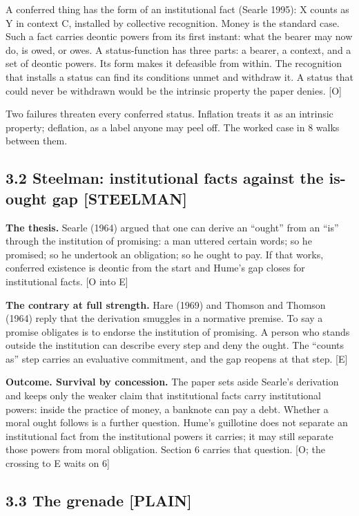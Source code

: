 \documentclass[11pt]{article}
\newcommand{\register}[1]{{\ttfamily\small #1}}
\begin{document}
A conferred thing has the form of an institutional fact (Searle 1995): X counts as Y in context C, installed by collective recognition. Money is the standard case. Such a fact carries deontic powers from its first instant: what the bearer may now do, is owed, or owes. A status-function has three parts: a bearer, a context, and a set of deontic powers. Its form makes it defeasible from within. The recognition that installs a status can find its conditions unmet and withdraw it. A status that could never be withdrawn would be the intrinsic property the paper denies. [O]

Two failures threaten every conferred status. Inflation treats it as an intrinsic property; deflation, as a label anyone may peel off. The worked case in 8 walks between them.

\subsection*{3.2 Steelman: institutional facts against the is-ought gap \register{[STEELMAN]}}

\textbf{The thesis.} Searle (1964) argued that one can derive an ``ought'' from an ``is'' through the institution of promising: a man uttered certain words; so he promised; so he undertook an obligation; so he ought to pay. If that works, conferred existence is deontic from the start and Hume's gap closes for institutional facts. [O into E]

\textbf{The contrary at full strength.} Hare (1969) and Thomson and Thomson (1964) reply that the derivation smuggles in a normative premise. To say a promise obligates is to endorse the institution of promising. A person who stands outside the institution can describe every step and deny the ought. The ``counts as'' step carries an evaluative commitment, and the gap reopens at that step. [E]

\textbf{Outcome. Survival by concession.} The paper sets aside Searle's derivation and keeps only the weaker claim that institutional facts carry institutional powers: inside the practice of money, a banknote can pay a debt. Whether a moral ought follows is a further question. Hume's guillotine does not separate an institutional fact from the institutional powers it carries; it may still separate those powers from moral obligation. Section 6 carries that question. [O; the crossing to E waits on 6]

\subsection*{3.3 The grenade \register{[PLAIN]}}
\end{document}
